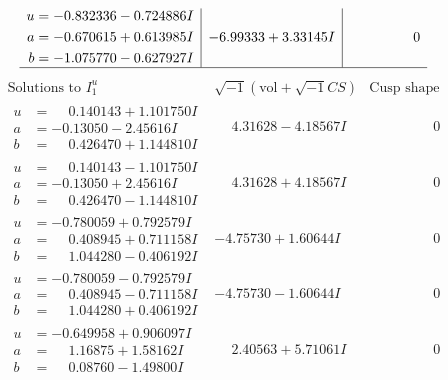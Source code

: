 \documentclass[1p]{elsarticle_modified}
\theoremstyle{definition}
\newcommand{\I}{\sqrt{-1}}
\begin{document}
$$\begin{array}{c|c|c}
\begin{aligned}
u &= -0.832336 - 0.724886 I \\
a &= -0.670615 + 0.613985 I \\
b &= -1.075770 - 0.627927 I\end{aligned}
 & -6.99333 + 3.33145 I & \phantom{-0.000000 } 0\\
 \hline 
 \end{array}$$\newpage$$\begin{array}{c|c|c}  
\text{Solutions to }I^u_{1}& \I (\text{vol} + \sqrt{-1}CS) & \text{Cusp shape}\\
 \hline 
\begin{aligned}
u &= \phantom{-}0.140143 + 1.101750 I \\
a &= -0.13050 - 2.45616 I \\
b &= \phantom{-}0.426470 + 1.144810 I\end{aligned}
 & \phantom{-}4.31628 - 4.18567 I & \phantom{-0.000000 } 0 \\ \hline\begin{aligned}
u &= \phantom{-}0.140143 - 1.101750 I \\
a &= -0.13050 + 2.45616 I \\
b &= \phantom{-}0.426470 - 1.144810 I\end{aligned}
 & \phantom{-}4.31628 + 4.18567 I & \phantom{-0.000000 } 0 \\ \hline\begin{aligned}
u &= -0.780059 + 0.792579 I \\
a &= \phantom{-}0.408945 + 0.711158 I \\
b &= \phantom{-}1.044280 - 0.406192 I\end{aligned}
 & -4.75730 + 1.60644 I & \phantom{-0.000000 } 0 \\ \hline\begin{aligned}
u &= -0.780059 - 0.792579 I \\
a &= \phantom{-}0.408945 - 0.711158 I \\
b &= \phantom{-}1.044280 + 0.406192 I\end{aligned}
 & -4.75730 - 1.60644 I & \phantom{-0.000000 } 0 \\ \hline\begin{aligned}
u &= -0.649958 + 0.906097 I \\
a &= \phantom{-}1.16875 + 1.58162 I \\
b &= \phantom{-}0.08760 - 1.49800 I\end{aligned}
 & \phantom{-}2.40563 + 5.71061 I & \phantom{-0.000000 } 0 \\ \hline\begin{aligned}

\end{aligned}
\end{array}$$
\end{document}
